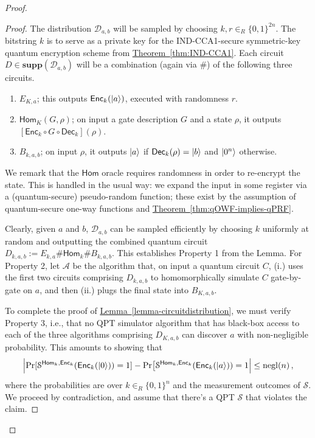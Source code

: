 \documentclass[envcountsame]{llncs}
\numberwithin{equation}{section}
\newcommand{\opn}{\operatorname}
\newcommand{\expref}[2]{\texorpdfstring{\hyperref[#2]{#1~\ref{#2}}}{#1~\ref{#2}}}
\newcommand{\algo}{\mathcal}
\newcommand{\negl}{\opn{negl}}
\newcommand{\Enc}{\ensuremath{\mathsf{Enc}}\xspace}
\newcommand{\Dec}{\ensuremath{\mathsf{Dec}}\xspace}
\newcommand{\Homorcl}{\ensuremath{\mathsf{Hom}}\xspace}
\newcommand{\inrand}{\in_R}
\newcommand\supp{\textbf{supp}}
\begin{document}
\begin{proof}
\begin{proof} The distribution $\mathcal D_{a, b}$ will be sampled by choosing $k, r \inrand \{0, 1\}^{2n}$. The bitstring $k$ is to serve as a private key for the IND-CCA1-secure symmetric-key quantum encryption scheme from \expref{Theorem}{thm:IND-CCA1}. Each circuit $D\in \supp(\mathcal{D}_{a,b})$ will be a combination (again via \#) of the following three circuits. 
\begin{enumerate}
\item $E_{K,a}$; this outputs $\Enc_k(\ket{a})$, executed with randomness $r$. 
\item $\Homorcl_K(G,\rho)$; on input a gate description $G$ and a state $\rho$, it outputs $[\Enc_k \circ G \circ \Dec_k](\rho)$.
\item $B_{k,a,b}$; on input $\rho$, it outputs ${\left\vert{a}\right\rangle}$ if $\Dec_{k}(\rho)= \ket{b}$ and ${\left\vert{0^n}\right\rangle}$ otherwise.
\end{enumerate}
We remark that the $\Homorcl$ oracle requires randomness in order to re-encrypt the state. This is handled in the usual way: we expand the input in some register via a (quantum-secure) pseudo-random function; these exist by the assumption of quantum-secure one-way functions and \expref{Theorem}{thm:qOWF-implies-qPRF}. 

Clearly, given $a$ and $b$, $\mathcal{D}_{a,b}$ can be sampled efficiently by choosing $k$ uniformly at random and outputting the combined quantum circuit $D_{k, a, b} := E_{k,a}\#\Homorcl_{k}\#B_{k,a,b}$. This establishes Property 1 from the Lemma.  For Property 2, let $\algo{A}$ be the algorithm that, on input a quantum circuit $C$, (i.) uses the first two circuits comprising $D_{k,a,b}$ to homomorphically simulate $C$ gate-by-gate on $a$, and then (ii.) plugs the final state into $B_{K,a,b}$. 

To complete the proof of \expref{Lemma}{lemma-circuitdistribution}, we must verify Property 3, i.e., that no QPT simulator algorithm that has black-box access to  each of the three algorithms comprising $D_{K,a,b}$ can discover $a$ with non-negligible probability.  This amounts to showing that
\begin{equation}\label{eq:hom-gap}
\Bigl| \Pr[\mathcal S^{\Homorcl_k,\Enc_k}(\Enc_k(\ket{0})) = 1] 
- \Pr\bigl[\mathcal S^{\Homorcl_k,\Enc_k}(\Enc_k(\ket{a})) = 1 \Bigr| 
\leq \negl(n)\,,
\end{equation}
where the probabilities are over $k \inrand \{0,1\}^n$ and the measurement outcomes of $\algo{S}$. We proceed by contradiction, and assume that there's a QPT $\algo{S}$ that violates the claim. 


\end{proof}
\end{proof}
\end{document}

